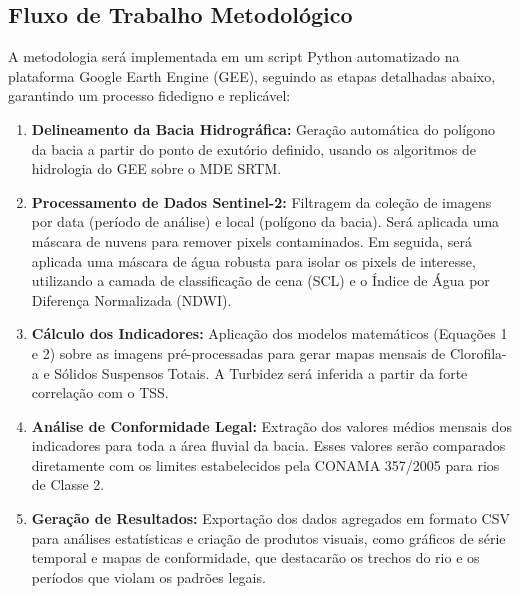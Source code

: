 \documentclass[12pt, a4paper]{article}
\begin{document}
\subsection{Fluxo de Trabalho Metodológico}
A metodologia será implementada em um script Python automatizado na plataforma Google Earth Engine (GEE), seguindo as etapas detalhadas abaixo, garantindo um processo fidedigno e replicável:
\begin{enumerate}
    \item \textbf{Delineamento da Bacia Hidrográfica:} Geração automática do polígono da bacia a partir do ponto de exutório definido, usando os algoritmos de hidrologia do GEE sobre o MDE SRTM.
    \item \textbf{Processamento de Dados Sentinel-2:} Filtragem da coleção de imagens por data (período de análise) e local (polígono da bacia). Será aplicada uma máscara de nuvens para remover pixels contaminados. Em seguida, será aplicada uma máscara de água robusta para isolar os pixels de interesse, utilizando a camada de classificação de cena (SCL) e o Índice de Água por Diferença Normalizada (NDWI).
    \item \textbf{Cálculo dos Indicadores:} Aplicação dos modelos matemáticos (Equações 1 e 2) sobre as imagens pré-processadas para gerar mapas mensais de Clorofila-a e Sólidos Suspensos Totais. A Turbidez será inferida a partir da forte correlação com o TSS.
    \item \textbf{Análise de Conformidade Legal:} Extração dos valores médios mensais dos indicadores para toda a área fluvial da bacia. Esses valores serão comparados diretamente com os limites estabelecidos pela CONAMA 357/2005 para rios de Classe 2.
    \item \textbf{Geração de Resultados:} Exportação dos dados agregados em formato CSV para análises estatísticas e criação de produtos visuais, como gráficos de série temporal e mapas de conformidade, que destacarão os trechos do rio e os períodos que violam os padrões legais.
\end{enumerate}

\end{document}
